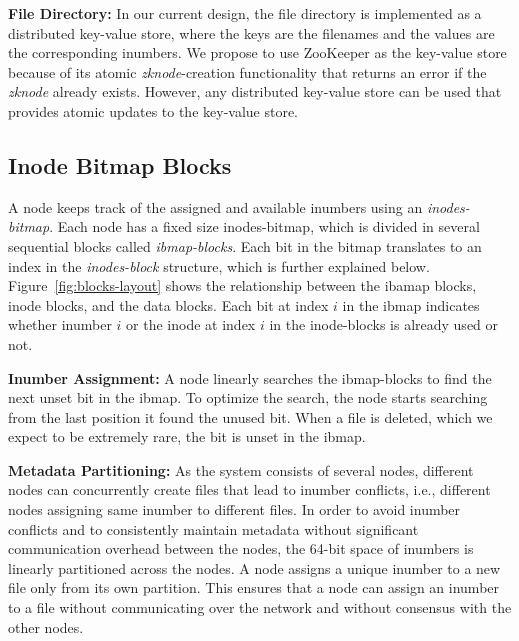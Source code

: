 \documentclass[]{article}
\newcommand{\subtopic}[1]{\vspace{1.5pt} \noindent \textbf{#1}}
\begin{document}
\subtopic{File Directory:}
In our current design, the file directory is implemented as a distributed
key-value store, where the keys are the filenames and the values are the corresponding
inumbers. We propose to use ZooKeeper as the key-value store because of its
atomic \textit{zknode}-creation functionality that returns an error if
the \textit{zknode} already exists. However, any distributed key-value store can be used 
that provides atomic updates to the key-value store.


\subsection{Inode Bitmap Blocks}
A node keeps track of the assigned and available inumbers using an \textit{inodes-bitmap}.
Each node has a fixed size inodes-bitmap, which is divided in several sequential blocks
called \textit{ibmap-blocks}. Each bit in the bitmap translates to an index in the
\textit{inodes-block} structure, which is further explained below.
Figure~\ref{fig:blocks-layout} shows the relationship between the ibamap blocks, 
inode blocks, and the data blocks. Each bit at index $i$ in the
ibmap indicates whether inumber $i$ or the inode at index $i$ in the inode-blocks
is already used or not.

\subtopic{Inumber Assignment:}
A node linearly searches the ibmap-blocks to find the next unset bit in the ibmap.
To optimize the search, the node starts searching from the last position it
found the unused bit. When a file is deleted, which we expect to be extremely
rare, the bit is unset in the ibmap.



\subtopic{Metadata Partitioning:} As the system consists of several nodes,
different nodes can concurrently create files that lead to inumber conflicts,
i.e., different nodes assigning same inumber to different files.  In order to
avoid inumber conflicts and to  consistently maintain metadata without
significant communication overhead between the nodes, the 64-bit space of
inumbers is linearly partitioned across the nodes. A node assigns a unique
inumber to a new file only from its own partition. This ensures that a node can
assign an inumber to a file without communicating over the network and without
consensus with the other nodes.
\end{document}
